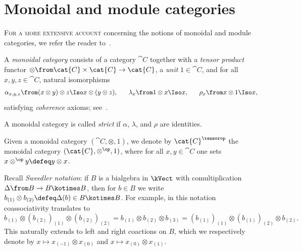 \section{Monoidal and module categories}\label{sec:mono-module-categ}

\textsc{For a more extensive account}
concerning the notions of monoidal and module categories,
we refer the reader to~\cite[Chapter~2]{Etingof2015}.

\begin{definition}\label{def:monoidal-category}
  A \emph{monoidal category} consists of a category \(\cat{C}\)
  together with a \emph{tensor product} functor \(\otimes \from \cat{C} \times \cat{C} \to \cat{C}\),
  a \emph{unit} \(1 \in \cat{C}\),
  and for all \(x, y, z \in \cat{C}\), natural isomorphisms
  \begin{align*}
    \alpha_{x, y, z} \from (x \otimes y) \otimes z \Iso x \otimes (y \otimes z),
    \quad\ \ %
    \lambda_{x} \from 1 \otimes x \Iso x,
    \quad\ \ %
    \rho_{x} \from x \otimes 1 \Iso x,
  \end{align*}
  satisfying \emph{coherence} axioms;
  see~\cite[Definition~2.1.1]{Etingof2015}.

  A monoidal category is called \emph{strict} if \(\alpha\), \(\lambda\), and \(\rho\) are identities.
\end{definition}

\begin{example}\label{ex:monoidal-rev}
  Given a monoidal category \((\cat{C}, \otimes, 1)\),
  we denote by \(\cat{C}^{\tensorop}\) the monoidal category \((\cat{C}, \otimes^{\op}, 1)\),
  where for all \(x, y \in \cat{C}\) one sets \(x \otimes^{\op} y \defeq y \otimes x\).
\end{example}

Recall \emph{Sweedler notation}:
if \(B\) is a bialgebra in \(\kVect\) with comultiplication \(\Delta\from B \to B \kotimes B\),
then for \(b \in B\) we write \(b_{(1)} \otimes b_{(2)} \defeq \Delta(b) \in B \kotimes B\).
For example, in this notation coassociativity translates to
\[
  b_{(1)} \otimes {(b_{(2)})}_{(1)} \otimes {(b_{(2)})}_{(2)}
  = b_{(1)} \otimes b_{(2)} \otimes b_{(3)}
  = {(b_{(1)})}_{(1)} \otimes {(b_{(1)})}_{(2)} \otimes b_{(2)}.
\]
This naturally extends to left and right coactions on \(B\),
which we respectively denote by \(x \mapsto x_{(-1)} \otimes x_{(0)}\) and \(x \mapsto x_{(0)} \otimes x_{(1)}\).

